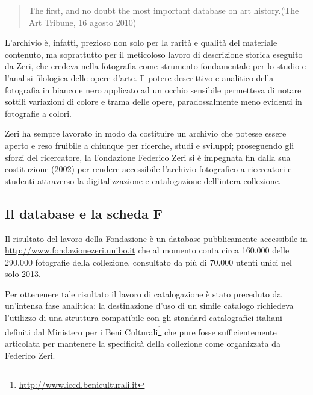 \begin{quote}
The first, and no doubt the most important database on art history.\hspace*{\fill}(The Art Tribune, 16 agosto 2010)
\end{quote}

L'archivio è, infatti, prezioso non solo per la rarità e qualità del materiale contenuto, ma soprattutto per il meticoloso lavoro di descrizione storica eseguito da Zeri, che credeva nella fotografia come strumento fondamentale per lo studio e l'analisi filologica delle opere d'arte. Il potere descrittivo e analitico della fotografia in bianco e nero applicato ad un occhio sensibile permetteva di notare sottili variazioni di colore e trama delle opere, paradossalmente meno evidenti in fotografie a colori.

Zeri ha sempre lavorato in modo da costituire un archivio che potesse essere aperto e reso fruibile a chiunque per ricerche, studi e sviluppi; proseguendo gli sforzi del ricercatore, la Fondazione Federico Zeri si è impegnata fin dalla sua costituzione (2002) per rendere accessibile l'archivio fotografico a ricercatori e studenti attraverso la digitalizzazione e catalogazione dell'intera collezione.

\subsection{Il database e la scheda F}
Il risultato del lavoro della Fondazione è un database pubblicamente accessibile in \url{http://www.fondazionezeri.unibo.it} che al momento conta circa 160.000 delle 290.000 fotografie della collezione, consultato da più di 70.000 utenti unici nel solo 2013.

Per ottenenere tale risultato il lavoro di catalogazione è stato preceduto da un'intensa fase analitica: la destinazione d'uso di un simile catalogo richiedeva l'utilizzo di una struttura compatibile con gli standard catalografici italiani definiti dal Ministero per i Beni Culturali\footnote{\url{http://www.iccd.beniculturali.it}} che pure fosse sufficientemente articolata per mantenere la specificità della collezione come organizzata da Federico Zeri.

